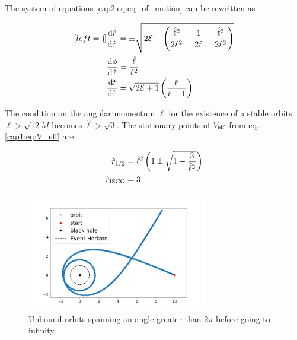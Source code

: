 The system of equations \eqref{cap2:eq:eq_of_motion} can be rewritten as

\begin{subequations}
    \begin{align}[left = {\empheqlbrace}]
        &\dv{\hat r}{\hat \tau} = \pm \sqrt{2 \mathcal E
        - \left(\frac{\hat \ell^2}{2 \hat r^2} - \frac{1}{2 \hat r}
        - \frac{\hat \ell^2}{2 \hat r^3} \right)}
        \label{cap2:eq:radial_eq_dimless} \\
        &\dv{\phi}{\hat \tau} = \frac{\hat \ell}{\hat r^2}
        \label{cap2:eq:angular_eq_dimless} \\
        &\dv{t}{\hat \tau} = \sqrt{2 \mathcal E + 1}
        \left(\frac{\hat r}{\hat r - 1}\right) \label{cap2:eq:time_eq_dimless}
    \end{align}
    \label{cap2:eq:eq_of_motion_dimless}
\end{subequations}

The condition on the angular momentum $\ell$ for the existence of a stable
orbits $\ell > \sqrt{12} M$ becomes $\hat \ell > \sqrt{3}$.
The stationary points of $V_{\rm eff}$ from eq. \ref{cap1:eq:V_eff} are

\begin{subequations}
    \begin{align}
        \hat r_{1 / 2} &= \hat \ell^2
        \left(1 \pm \sqrt{1 - \frac{3}{\hat \ell^2}} \right)\\
        \hat r_{\rm ISCO} &= 3
    \end{align}
\end{subequations}

\begin{figure}[h]
    \centering
    \includegraphics[width=0.7\textwidth]{Figures/chapter2/cool.png}
    \caption{Unbound orbits spanning an angle greater than $2 \pi$ before going
    to infinity.}
    \label{cap2:fig:V_eff}
\end{figure}


